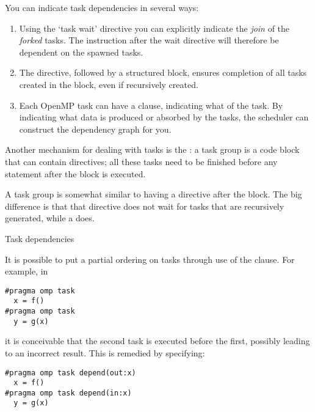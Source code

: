 You can indicate task dependencies in several ways:
\begin{enumerate}
\item Using the `task wait' directive you can explicitly indicate
  the \emph{join} of the
  \emph{forked} tasks. The instruction after the wait directive
  will therefore be dependent on the spawned tasks.
\item The  directive, followed
  by a structured block, ensures completion of all tasks
  created in the block, even if recursively created.
\item Each OpenMP task can have a 
  clause, indicating what  of the task.
  By indicating what data is produced or absorbed by the tasks,
  the scheduler can construct the dependency graph for you.
\end{enumerate}

Another mechanism for dealing with tasks is the
: a task group is a code block that can
contain  directives; all these tasks need to be
finished before any statement after the block is executed.

A task group is somewhat similar to having a 
directive after the block. The big difference is that that
 directive does not wait for tasks that are recursively
generated, while a  does.


 {Task dependencies}

It is possible to put a partial ordering on
tasks through use of the  clause. For example, in
\begin{lstlisting}
#pragma omp task
  x = f()
#pragma omp task
  y = g(x)
\end{lstlisting}
it is conceivable that the second task is executed before the first,
possibly leading to an incorrect result. This is remedied by specifying:
\begin{lstlisting}
#pragma omp task depend(out:x)
  x = f()
#pragma omp task depend(in:x)
  y = g(x)
\end{lstlisting}

